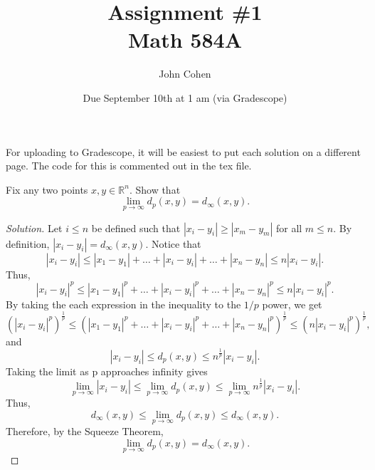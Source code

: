 \documentclass[11pt,letterpaper]{article}
\title{Assignment \#1\\Math 584A}
\author{
	John Cohen
	}
\date{Due September 10th at 1 am (via Gradescope)}
\newcommand{\R}{\mathbb{R}}
\newenvironment{prob}[1]
  {\renewcommand\theinnerprob{#1}\innerprob}
  {\endinnerprob}
\newenvironment{solution}
  {\renewcommand\qedsymbol{}\begin{proof}[Solution]}
  {\end{proof}\bigskip}
\begin{document}
\maketitle

For uploading to Gradescope, it will be easiest to put each solution on a different page.  The code for this is commented out in the tex file.








\begin{prob}{1}  %
Fix any two points $x,y\in \R^n$.  Show that
\[
	\lim_{p\to\infty} d_p(x,y) = d_\infty(x,y).
\]
\end{prob}
\begin{solution}
	Let $i\leq n$ be defined such that $|x_i-y_i| \geq |x_m-y_m|$ for all $m\leq n$. By definition, $|x_i-y_i| = d_\infty(x,y)$. Notice that $$|x_i-y_i| \leq |x_1-y_1| + \dotsc + |x_i-y_i|+ \dotsc + |x_n-y_n|\leq n|x_i-y_i|.$$ Thus, $$|x_i-y_i|^p \leq |x_1-y_1|^p + \dotsc + |x_i-y_i|^p+ \dotsc + |x_n-y_n|^p\leq n|x_i-y_i|^p.$$ By taking the each expression in the inequality to the $1/p$ power, we get $$(|x_i-y_i|^p)^{\frac{1}{p}} \leq (|x_1-y_1|^p + \dotsc + |x_i-y_i|^p+ \dotsc +|x_n-y_n|^p)^{\frac{1}{p}} \leq (n|x_i-y_i|^p)^{\frac{1}{p}},$$ and $$|x_i-y_i| \leq d_p(x,y) \leq n^\frac{1}{p}|x_i-y_i|.$$ Taking the limit as p approaches infinity gives $$\lim_{p\to\infty}|x_i-y_i| \leq \lim_{p\to\infty}d_p(x,y) \leq \lim_{p\to\infty}n^\frac{1}{p}|x_i-y_i|.$$ Thus, $$d_\infty(x,y) \leq \lim_{p\to\infty}d_p(x,y) \leq d_\infty(x,y).$$ Therefore, by the Squeeze Theorem,
	\[
	\lim_{p\to\infty} d_p(x,y) = d_\infty(x,y).
	\]
\end{solution}
\newpage
\end{document}
